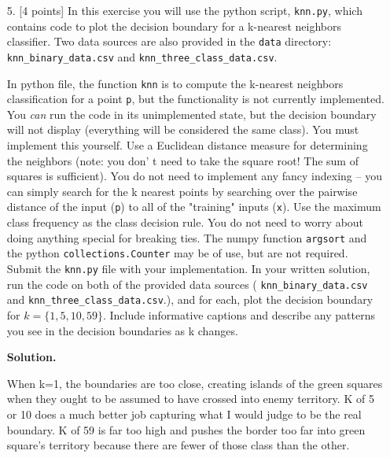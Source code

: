 \documentclass[10pt]{article}
\begin{document}
\begin{itemize}
{\bf Solution.}




\item[5.]  [4 points]
In this exercise you will use the python script, {\tt knn.py}, which contains code to plot the decision boundary for a k-nearest neighbors classifier.  Two data sources are also provided in the {\tt data} directory: {\tt knn\_binary\_data.csv} and {\tt knn\_three\_class\_data.csv}.

In python file, the function {\tt knn} is to compute the k-nearest neighbors classification for a point {\tt p}, but the functionality is not currently implemented.  You \emph{can} run the code in its unimplemented state, but the decision boundary will not display (everything will be considered the same class).  You must implement this yourself.  Use a Euclidean distance measure for determining the neighbors (note: you don' t need to take the square root! The sum of squares is sufficient).  You do not need to implement any fancy indexing -- you can simply search for the k nearest points by searching over the pairwise distance of the input ({\tt p}) to all of the "training" inputs ({\tt x}).  Use the maximum class frequency as the class decision rule.  You do not need to worry about doing anything special for breaking ties.  The numpy function {\tt argsort} and the python {\tt collections.Counter} may be of use, but are not required.  Submit the {\tt knn.py} file with your implementation.  In your written solution, run the code on both of the provided data sources ( {\tt knn\_binary\_data.csv} and {\tt knn\_three\_class\_data.csv}.), and for each, plot the decision boundary for $k = \{1, 5, 10, 59\}$.  Include informative captions and describe any patterns you see in the decision boundaries as k changes.

{\bf Solution.}

When k=1, the boundaries are too close, creating islands of the green squares when they ought to be assumed to have crossed into enemy territory. K of 5 or 10 does a much better job capturing what I would judge to be the real boundary. K of 59 is far too high and pushes the border too far into green square's territory because there are fewer of those class than the other.


\end{itemize}
\end{document}
